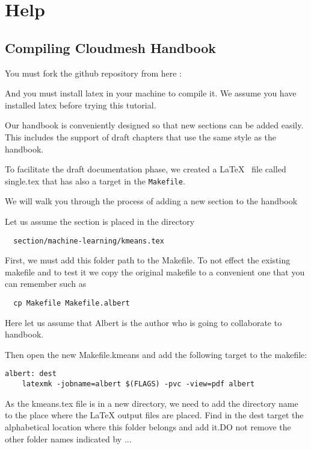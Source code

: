 \chapter{Help}

\section{Compiling Cloudmesh Handbook}\label{s:help-compile-handbook}

You must fork the github repository from here :

And you must install latex in your machine to compile it. We assume
you have installed latex before trying this tutorial.

Our handbook is conveniently designed so that new sections can be
added easily. This includes the support of draft chapters that use the
same style as the handbook.

To facilitate the draft documentation phase, we created a \LaTeX~ file
called single.tex that has also a target in the \verb|Makefile|.

We will walk you through the process of adding a new section to the handbook

Let us assume the section is placed in the directory

\begin{lstlisting}
  section/machine-learning/kmeans.tex 
\end{lstlisting}

First, we must add this folder path to the Makefile. To not effect the
existing makefile and to test it we copy the original makefile to a
convenient one that you can remember such as

\begin{lstlisting}
  cp Makefile Makefile.albert
\end{lstlisting}

Here let us assume that Albert is the author who is going to
collaborate to handbook.

Then open the new Makefile.kmeans and add the following target to the
makefile:

\begin{lstlisting}
albert: dest 
	latexmk -jobname=albert $(FLAGS) -pvc -view=pdf albert
\end{lstlisting}  

As the kmeans.tex file is in a new directory, we need to add the
directory name to the place where the LaTeX output files are placed.
Find in the dest target the alphabetical location where  this folder
belongs and add it.DO not remove the other folder names indicated by
...


